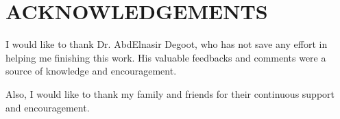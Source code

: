 \chapter*{ACKNOWLEDGEMENTS}
%

 I would like to thank Dr. AbdElnasir Degoot, who has not save any effort in helping me finishing this work.  His valuable feedbacks and comments were a source of knowledge and encouragement.
  
Also, I would like to thank my family and friends for their continuous support and encouragement.

\
\

\
\
\
\

\

